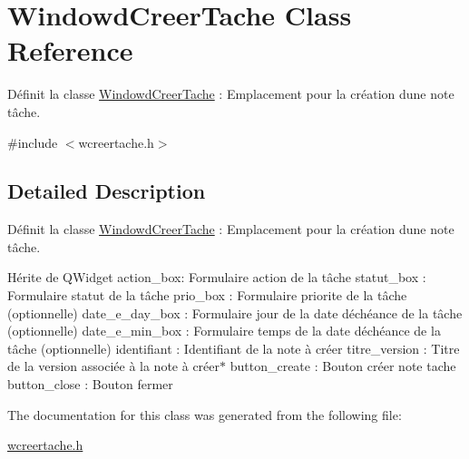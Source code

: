 \hypertarget{class_windowd_creer_tache}{}\section{Windowd\+Creer\+Tache Class Reference}
\label{class_windowd_creer_tache}


Définit la classe \hyperlink{class_windowd_creer_tache}{Windowd\+Creer\+Tache} \+: Emplacement pour la création d\textquotesingle{}une note tâche.  




{\ttfamily \#include $<$wcreertache.\+h$>$}



\subsection{Detailed Description}
Définit la classe \hyperlink{class_windowd_creer_tache}{Windowd\+Creer\+Tache} \+: Emplacement pour la création d\textquotesingle{}une note tâche. 

Hérite de Q\+Widget action\+\_\+box\+: Formulaire action de la tâche statut\+\_\+box \+: Formulaire statut de la tâche prio\+\_\+box \+: Formulaire priorite de la tâche (optionnelle) date\+\_\+e\+\_\+day\+\_\+box \+: Formulaire jour de la date d\textquotesingle{}échéance de la tâche (optionnelle) date\+\_\+e\+\_\+min\+\_\+box \+: Formulaire temps de la date d\textquotesingle{}échéance de la tâche (optionnelle) identifiant \+: Identifiant de la note à créer titre\+\_\+version \+: Titre de la version associée à la note à créer$\ast$ button\+\_\+create \+: Bouton créer note tache button\+\_\+close \+: Bouton fermer 

The documentation for this class was generated from the following file\+:\begin{DoxyCompactItemize}
\item 
\hyperlink{wcreertache_8h}{wcreertache.\+h}\end{DoxyCompactItemize}
